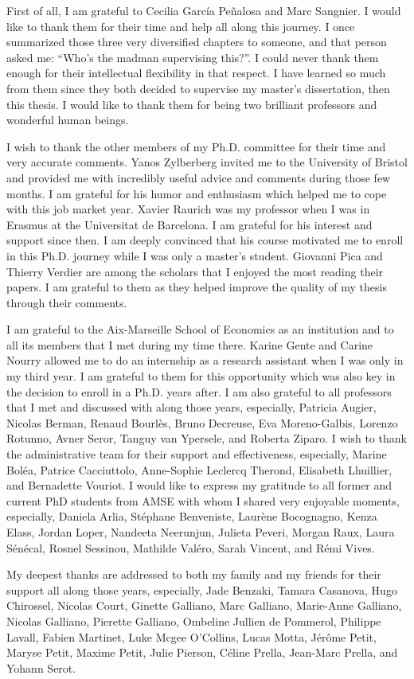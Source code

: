 First of all, I am grateful to Cecilia García Peñalosa and Marc Sangnier. I would like to thank them for their time and help all along this journey. I once summarized those three very diversified chapters to someone, and that person asked me: ``Who's the madman supervising this?''. I could never thank them enough for their intellectual flexibility in that respect. I have learned so much from them since they both decided to supervise my master's dissertation, then this thesis. I would like to thank them for being two brilliant professors and wonderful human beings.

I wish to thank the other members of my Ph.D. committee for their time and very accurate comments. 
Yanos Zylberberg invited me to the University of Bristol and provided me with incredibly useful advice and comments during those few months. I am grateful for his humor and enthusiasm which helped me to cope with this job market year. 
Xavier Raurich was my professor when I was in Erasmus at the Universitat de Barcelona. I am grateful for his interest and support since then. I am deeply convinced that his course motivated me to enroll in this Ph.D. journey while I was only a master's student. 
Giovanni Pica and Thierry Verdier are among the scholars that I enjoyed the most reading their papers. I am grateful to them as they helped improve the quality of my thesis through their comments.

I am grateful to the Aix-Marseille School of Economics as an institution and to all its members that I met during my time there. Karine Gente and Carine Nourry allowed me to do an internship as a research assistant when I was only in my third year. I am grateful to them for this opportunity which was also key in the decision to enroll in a Ph.D. years after. 
I am also grateful to all professors that I met and discussed with along those years, especially, Patricia Augier, Nicolas Berman, Renaud Bourlès, Bruno Decreuse, Eva Moreno-Galbis, Lorenzo Rotunno, Avner Seror, Tanguy van Ypersele, and Roberta Ziparo. 
I wish to thank the administrative team for their support and effectiveness, especially, Marine Boléa, Patrice Cacciuttolo, Anne-Sophie Leclercq Therond, Elisabeth Lhuillier, and Bernadette Vouriot.
I would like to express my gratitude to all former and current PhD students from AMSE with whom I shared very enjoyable moments, especially, Daniela Arlia, Stéphane Benveniste, Laurène Bocognagno, Kenza Elass, Jordan Loper, Nandeeta Neerunjun, Julieta Peveri, Morgan Raux, Laura Sénécal, Rosnel Sessinou, Mathilde Valéro, Sarah Vincent, and Rémi Vives.

My deepest thanks are addressed to both my family and my friends for their support all along those years, especially, 
Jade Benzaki, Tamara Casanova, Hugo Chirossel, Nicolas Court,
Ginette Galliano, Marc Galliano, Marie-Anne Galliano, Nicolas Galliano, Pierette Galliano,
Ombeline Jullien de Pommerol, Philippe Lavall, Fabien Martinet, Luke Mcgee O'Collins, Lucas Motta,
Jérôme Petit, Maryse Petit, Maxime Petit, 
Julie Pierson, Céline Prella, Jean-Marc Prella,
and Yohann Serot.